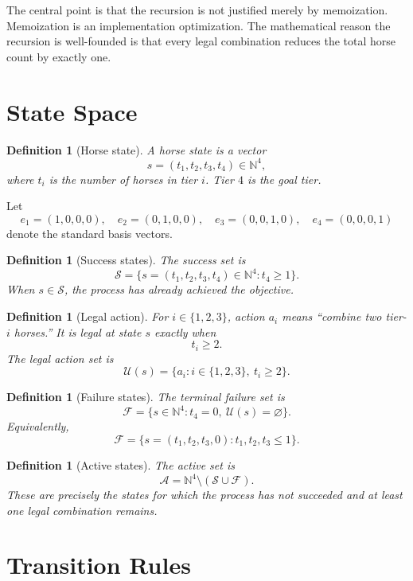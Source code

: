 \documentclass[11pt]{article}
\newtheorem{definition}[theorem]{Definition}
\newcommand{\N}{\mathbb{N}}
\newcommand{\Success}{\mathcal{S}}
\newcommand{\Failure}{\mathcal{F}}
\newcommand{\Active}{\mathcal{A}}
\newcommand{\Actions}{\mathcal{U}}
\begin{document}
The central point is that the recursion is not justified merely by memoization.  Memoization is an implementation optimization.  The mathematical reason the recursion is well-founded is that every legal combination reduces the total horse count by exactly one.

\section{State Space}

\begin{definition}[Horse state]
A horse state is a vector
\[
    s=(t_1,t_2,t_3,t_4)\in \N^4,
\]
where \(t_i\) is the number of horses in tier \(i\).  Tier \(4\) is the goal tier.
\end{definition}

Let
\[
    e_1=(1,0,0,0),\quad
    e_2=(0,1,0,0),\quad
    e_3=(0,0,1,0),\quad
    e_4=(0,0,0,1)
\]
denote the standard basis vectors.

\begin{definition}[Success states]
The success set is
\[
    \Success=\{s=(t_1,t_2,t_3,t_4)\in \N^4:t_4\ge 1\}.
\]
When \(s\in\Success\), the process has already achieved the objective.
\end{definition}

\begin{definition}[Legal action]
For \(i\in\{1,2,3\}\), action \(a_i\) means ``combine two tier-\(i\) horses.''  It is legal at state \(s\) exactly when
\[
    t_i\ge 2.
\]
The legal action set is
\[
    \Actions(s)=\{a_i:i\in\{1,2,3\},\ t_i\ge 2\}.
\]
\end{definition}

\begin{definition}[Failure states]
The terminal failure set is
\[
    \Failure=\{s\in \N^4:t_4=0,\ \Actions(s)=\varnothing\}.
\]
Equivalently,
\[
    \Failure=\{s=(t_1,t_2,t_3,0):t_1,t_2,t_3\le 1\}.
\]
\end{definition}

\begin{definition}[Active states]
The active set is
\[
    \Active=\N^4\setminus(\Success\cup\Failure).
\]
These are precisely the states for which the process has not succeeded and at least one legal combination remains.
\end{definition}

\section{Transition Rules}
\end{document}
